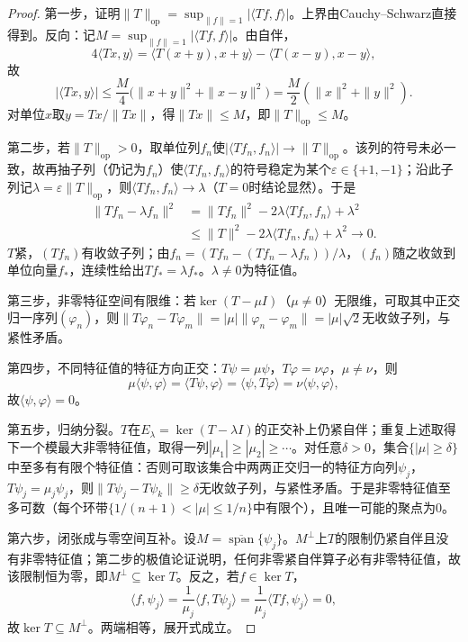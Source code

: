 \begin{proof}
第一步，证明$\|T\|_{\mathrm{op}}=\sup_{\|f\|=1}|\langle Tf,f\rangle|$。上界由Cauchy–Schwarz直接得到。反向：记$M=\sup_{\|f\|=1}|\langle Tf,f\rangle|$。由自伴，
\[
4\langle Tx,y\rangle=\langle T(x+y),x+y\rangle-\langle T(x-y),x-y\rangle,
\]
故
\[
|\langle Tx,y\rangle|\le\frac M4\bigl(\|x+y\|^2+\|x-y\|^2\bigr)
=\frac M2(\|x\|^2+\|y\|^2).
\]
对单位$x$取$y=Tx/\|Tx\|$，得$\|Tx\|\le M$，即$\|T\|_{\mathrm{op}}\le M$。

第二步，若$\|T\|_{\mathrm{op}}>0$，取单位列$f_n$使$|\langle Tf_n,f_n\rangle|\to\|T\|_{\mathrm{op}}$。该列的符号未必一致，故再抽子列（仍记为$f_n$）使$\langle Tf_n,f_n\rangle$的符号稳定为某个$\varepsilon\in\{+1,-1\}$；沿此子列记$\lambda=\varepsilon\|T\|_{\mathrm{op}}$，则$\langle Tf_n,f_n\rangle\to\lambda$（$T=0$时结论显然）。于是
\[
\begin{aligned}
\|Tf_n-\lambda f_n\|^2
&=\|Tf_n\|^2-2\lambda\langle Tf_n,f_n\rangle+\lambda^2\\
&\le\|T\|^2-2\lambda\langle Tf_n,f_n\rangle+\lambda^2\longrightarrow0.
\end{aligned}
\]
$T$紧，$(Tf_n)$有收敛子列；由$f_n=(Tf_n-(Tf_n-\lambda f_n))/\lambda$，$(f_n)$随之收敛到单位向量$f_*$，连续性给出$Tf_*=\lambda f_*$。$\lambda\ne0$为特征值。

第三步，非零特征空间有限维：若$\ker(T-\mu I)$（$\mu\ne0$）无限维，可取其中正交归一序列$(\varphi_n)$，则$\|T\varphi_n-T\varphi_m\|=|\mu|\|\varphi_n-\varphi_m\|=|\mu|\sqrt2$无收敛子列，与紧性矛盾。

第四步，不同特征值的特征方向正交：$T\psi=\mu\psi$，$T\varphi=\nu\varphi$，$\mu\ne\nu$，则
\[
\mu\langle\psi,\varphi\rangle=\langle T\psi,\varphi\rangle=\langle\psi,T\varphi\rangle=\nu\langle\psi,\varphi\rangle,
\]
故$\langle\psi,\varphi\rangle=0$。

第五步，归纳分裂。$T$在$E_\lambda=\ker(T-\lambda I)$的正交补上仍紧自伴；重复上述取得下一个模最大非零特征值，取得一列$|\mu_1|\ge|\mu_2|\ge\cdots$。对任意$\delta>0$，集合$\{|\mu|\ge\delta\}$中至多有有限个特征值：否则可取该集合中两两正交归一的特征方向列$\psi_j$，$T\psi_j=\mu_j\psi_j$，则$\|T\psi_j-T\psi_k\|\ge\delta$无收敛子列，与紧性矛盾。于是非零特征值至多可数（每个环带$\{1/(n+1)<|\mu|\le1/n\}$中有限个），且唯一可能的聚点为$0$。

第六步，闭张成与零空间互补。设$M=\overline{\operatorname{span}}\{\psi_j\}$。$M^\perp$上$T$的限制仍紧自伴且没有非零特征值；第二步的极值论证说明，任何非零紧自伴算子必有非零特征值，故该限制恒为零，即$M^\perp\subseteq\ker T$。反之，若$f\in\ker T$，
\[
\langle f,\psi_j\rangle=\frac1{\mu_j}\langle f,T\psi_j\rangle=\frac1{\mu_j}\langle Tf,\psi_j\rangle=0,
\]
故$\ker T\subseteq M^\perp$。两端相等，展开式成立。
\end{proof}

